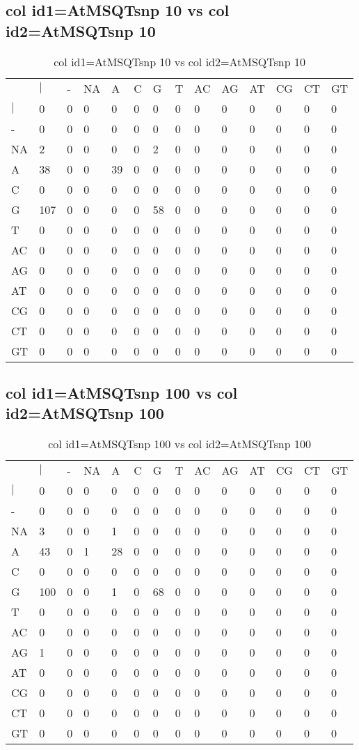 \subsection{col id1=AtMSQTsnp 10 vs col id2=AtMSQTsnp 10}
\begin{center}
\begin{longtable}{|l|l|l|l|l|l|l|l|l|l|l|l|l|l|}
\caption{col id1=AtMSQTsnp 10 vs col id2=AtMSQTsnp 10} \label{table_dm494}\\
\hline
\\
\hline
&$|$&-&NA&A&C&G&T&AC&AG&AT&CG&CT&GT\\
$|$&0&0&0&0&0&0&0&0&0&0&0&0&0\\
-&0&0&0&0&0&0&0&0&0&0&0&0&0\\
NA&2&0&0&0&0&2&0&0&0&0&0&0&0\\
A&38&0&0&39&0&0&0&0&0&0&0&0&0\\
C&0&0&0&0&0&0&0&0&0&0&0&0&0\\
G&107&0&0&0&0&58&0&0&0&0&0&0&0\\
T&0&0&0&0&0&0&0&0&0&0&0&0&0\\
AC&0&0&0&0&0&0&0&0&0&0&0&0&0\\
AG&0&0&0&0&0&0&0&0&0&0&0&0&0\\
AT&0&0&0&0&0&0&0&0&0&0&0&0&0\\
CG&0&0&0&0&0&0&0&0&0&0&0&0&0\\
CT&0&0&0&0&0&0&0&0&0&0&0&0&0\\
GT&0&0&0&0&0&0&0&0&0&0&0&0&0\\
\hline
\end{longtable}
\end{center}

\subsection{col id1=AtMSQTsnp 100 vs col id2=AtMSQTsnp 100}
\begin{center}
\begin{longtable}{|l|l|l|l|l|l|l|l|l|l|l|l|l|l|}
\caption{col id1=AtMSQTsnp 100 vs col id2=AtMSQTsnp 100} \label{table_dm496}\\
\hline
\\
\hline
&$|$&-&NA&A&C&G&T&AC&AG&AT&CG&CT&GT\\
$|$&0&0&0&0&0&0&0&0&0&0&0&0&0\\
-&0&0&0&0&0&0&0&0&0&0&0&0&0\\
NA&3&0&0&1&0&0&0&0&0&0&0&0&0\\
A&43&0&1&28&0&0&0&0&0&0&0&0&0\\
C&0&0&0&0&0&0&0&0&0&0&0&0&0\\
G&100&0&0&1&0&68&0&0&0&0&0&0&0\\
T&0&0&0&0&0&0&0&0&0&0&0&0&0\\
AC&0&0&0&0&0&0&0&0&0&0&0&0&0\\
AG&1&0&0&0&0&0&0&0&0&0&0&0&0\\
AT&0&0&0&0&0&0&0&0&0&0&0&0&0\\
CG&0&0&0&0&0&0&0&0&0&0&0&0&0\\
CT&0&0&0&0&0&0&0&0&0&0&0&0&0\\
GT&0&0&0&0&0&0&0&0&0&0&0&0&0\\
\hline
\end{longtable}
\end{center}

